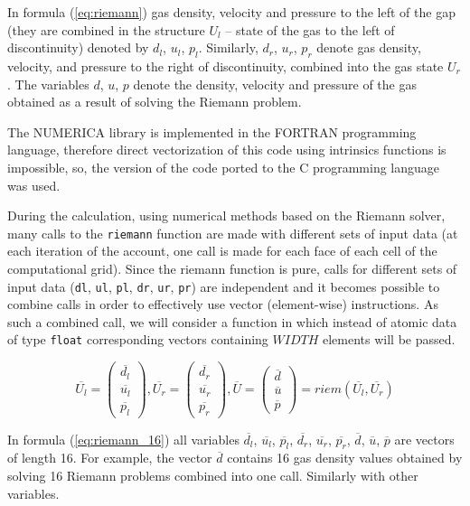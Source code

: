 \documentclass[
11pt,%
tightenlines,%
twoside,%
onecolumn,%
nofloats,%
nobibnotes,%
nofootinbib,%
superscriptaddress,%
noshowpacs,%
centertags]%
{revtex4}
\begin{document}
In formula (\ref{eq:riemann}) gas density, velocity and pressure to the left of the gap (they are combined in the structure $U_l$ -- state of the gas to the left of discontinuity) denoted by $d_l$, $u_l$, $p_l$.
Similarly, $d_r$, $u_r$, $p_r$ denote gas density, velocity, and pressure to the right of discontinuity, combined into the gas state $U_r$.
The variables $d$, $u$, $p$ denote the density, velocity and pressure of the gas obtained as a result of solving the Riemann problem.

The NUMERICA library is implemented in the FORTRAN programming language, therefore direct vectorization of this code using intrinsics functions is impossible, so, the version of the code ported to the C programming language was used.

During the calculation, using numerical methods based on the Riemann solver, many calls to the \texttt{riemann} function are made with different sets of input data (at each iteration of the account, one call is made for each face of each cell of the computational grid).
Since the riemann function is pure, calls for different sets of input data (\texttt{dl}, \texttt{ul}, \texttt{pl}, \texttt{dr}, \texttt{ur}, \texttt{pr}) are independent and it becomes possible to combine calls in order to effectively use vector (element-wise) instructions.
As such a combined call, we will consider a function in which instead of atomic data of type \texttt{float} corresponding vectors containing $WIDTH$ elements will be passed.

\begin{equation}\label{eq:riemann_16}
\overline{U_l} = \left( \begin{array}{ccc} \overline{d_l} \\ \overline{u_l} \\ \overline{p_l} \end{array} \right),
\overline{U_r} = \left( \begin{array}{ccc} \overline{d_r} \\ \overline{u_r} \\ \overline{p_r} \end{array} \right),
\overline{U} = \left( \begin{array}{ccc} \overline{d} \\ \overline{u} \\ \overline{p} \end{array} \right) = riem(\overline{U_l}, \overline{U_r})
\end{equation}

In formula (\ref{eq:riemann_16}) all variables $\overline{d_l}$, $\overline{u_l}$, $\overline{p_l}$, $\overline{d_r}$, $\overline{u_r}$, $\overline{p_r}$, $\overline{d}$, $\overline{u}$, $\overline{p}$ are vectors of length 16.
For example, the vector $\overline{d}$ contains 16 gas density values obtained by solving 16 Riemann problems combined into one call.
Similarly with other variables.
\end{document}
